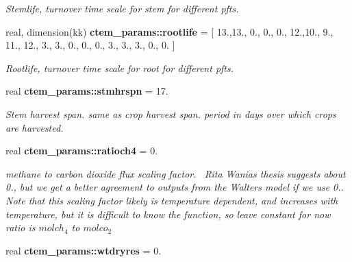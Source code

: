 \begin{DoxyCompactItemize}
\begin{DoxyCompactList}\small\item\em Stemlife, turnover time scale for stem for different pfts. \end{DoxyCompactList}\item 
\hypertarget{namespacectem__params_ad7b9c1585fd85afce280c21bf6f090c9}{}real, dimension(kk) {\bfseries ctem\+\_\+params\+::rootlife} = \mbox{[} 13.,13., 0., 0., 0., 12.,10., 9., 11., 12., 3., 3., 0., 0., 0., 3., 3., 3., 0., 0. \mbox{]}\label{namespacectem__params_ad7b9c1585fd85afce280c21bf6f090c9}

\begin{DoxyCompactList}\small\item\em Rootlife, turnover time scale for root for different pfts. \end{DoxyCompactList}\item 
\hypertarget{namespacectem__params_ae5c80ee006ea823900274412778709cf}{}real {\bfseries ctem\+\_\+params\+::stmhrspn} = 17.\label{namespacectem__params_ae5c80ee006ea823900274412778709cf}

\begin{DoxyCompactList}\small\item\em Stem harvest span. same as crop harvest span. period in days over which crops are harvested. \end{DoxyCompactList}\item 
\hypertarget{namespacectem__params_a34074497065d6cb2b9177c3fc400dcf3}{}real {\bfseries ctem\+\_\+params\+::ratioch4} = 0.\label{namespacectem__params_a34074497065d6cb2b9177c3fc400dcf3}

\begin{DoxyCompactList}\small\item\em methane to carbon dioxide flux scaling factor.~\newline
Rita Wania\textquotesingle{}s thesis suggests about 0., but we get a better agreement to outputs from the Walter\textquotesingle{}s model if we use 0.. Note that this scaling factor likely is temperature dependent, and increases with temperature, but it is difficult to know the function, so leave constant for now ratio is $mol ch_4$ to $mol co_2$ \end{DoxyCompactList}\item 
\hypertarget{namespacectem__params_a71227aca2a1e2963319a981847fa2874}{}real {\bfseries ctem\+\_\+params\+::wtdryres} = 0.\label{namespacectem__params_a71227aca2a1e2963319a981847fa2874}


\end{DoxyCompactItemize}
